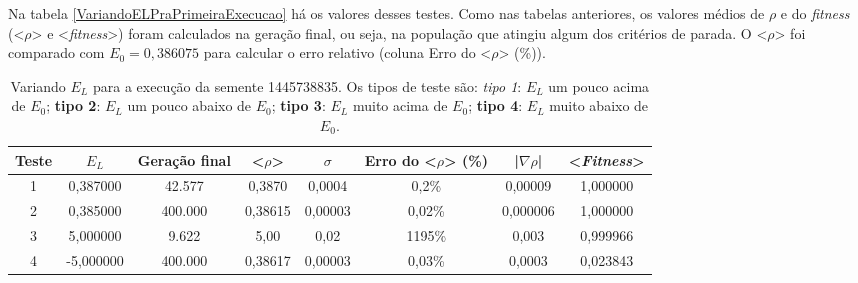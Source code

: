 	Na tabela \ref{VariandoELPraPrimeiraExecucao} há os valores desses testes. Como nas tabelas anteriores, os valores médios de $\rho$ e do \emph{fitness} (<$\rho$> e <\emph{fitness}>) foram calculados na geração final, ou seja, na população que atingiu algum dos critérios de parada. O <$\rho$> foi comparado com $E_0 = 0,386075$ para calcular o erro relativo (coluna Erro do <$\rho$> (\%)).
	
	

\begin{center}	
\begin{table}[htbp]
\caption{Variando $E_L$ para a execução da semente 1445738835. Os tipos de teste são: \textit{tipo 1}: $E_L$ um pouco acima de $E_0$; \textbf{tipo 2}: $E_L$ um pouco abaixo de $E_0$; \textbf{tipo 3}: $E_L$ muito acima de $E_0$; \textbf{tipo 4}: $E_L$ muito abaixo de $E_0$.}
\label{tab:VariandoELPraPrimeiraExecucao}
\centering
\begin{tabular}{cccccccc}
\hline \hline
\textbf{Teste} &  \textbf{$E_L$} & \textbf{Geração final} & \textbf{<$\rho$>} & \textbf{$\sigma$} & \textbf{Erro do <$\rho$> (\%)} & \textbf{|$\nabla \rho$|} & \textbf{<\emph{Fitness}>} \\
\hline \hline
         1 &   0,387000 &     42.577 &     0,3870 &     0,0004 &      0,2\% &    0,00009 &   1,000000 \\
\hline
         2 &   0,385000 &    400.000 &    0,38615 &    0,00003 &     0,02\% &   0,000006 &   1,000000 \\
\hline
         3 &   5,000000 &      9.622 &       5,00 &       0,02 &     1195\% &      0,003 &   0,999966 \\
\hline
         4 &  -5,000000 &    400.000 &    0,38617 &    0,00003 &     0,03\% &     0,0003 &   0,023843 \\
\hline \hline
\end{tabular}   
\end{table}
\end{center}	
	
